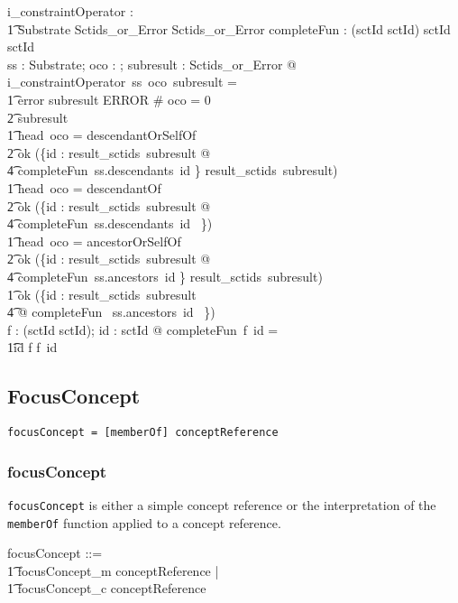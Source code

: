\documentclass{article}
\def\spec#1{{\tt #1}}
\begin{document}
\begin{gendef}
   i\_constraintOperator : \\
\t1 Substrate \pfun \optional[constraintOperator] \pfun Sctids\_or\_Error \pfun Sctids\_or\_Error
\also
   completeFun : (sctId \pfun \power sctId) \fun sctId \fun \power sctId \\
\where
	\forall ss : Substrate; oco : \optional[constraintOperator]; subresult : Sctids\_or\_Error @ \\
i\_constraintOperator~ss~oco~subresult = \\
\t1 \IF error \inv subresult \in ERROR \lor \# oco = 0 \\
\t2 \THEN subresult \\
\t1 \ELSE \IF head~oco = descendantOrSelfOf~ \\
\t2 \THEN ok (\bigcup \{id : result\_sctids~subresult @ \\
\t4 completeFun~ss.descendants~id \} \cup result\_sctids~subresult) \\
\t1 \ELSE \IF head~oco = descendantOf~ \\
\t2 \THEN ok  (\bigcup \{id : result\_sctids~subresult @ \\
\t4 completeFun~ss.descendants~id ~\}) \\
\t1 \ELSE \IF head~oco = ancestorOrSelfOf~ \\
\t2 \THEN  ok (\bigcup \{id : result\_sctids~subresult @ \\
\t4 completeFun~ss.ancestors~id \} \cup result\_sctids~subresult) \\
\t1 \ELSE  ok (\bigcup \{id : result\_sctids~subresult \\
\t4 @ completeFun~ ss.ancestors~id ~\}) \\
\also
   \forall f : (sctId \pfun \power sctId); id : sctId @ completeFun~f~id = \\
\t1\IF id \in \dom f \THEN f~id \ELSE \emptyset 
\end{gendef}


\subsection{FocusConcept}
\begin{verbatim}
focusConcept = [memberOf] conceptReference
\end{verbatim}
\subsubsection{focusConcept}
\spec{focusConcept} is either a simple concept reference or the interpretation of the \spec{memberOf} function applied to a concept reference.
\begin{zed}
focusConcept ::= \\
\t1 focusConcept\_m \ldata conceptReference \rdata | \\
\t1 focusConcept\_c \ldata conceptReference \rdata
\end{zed}
\end{document}

